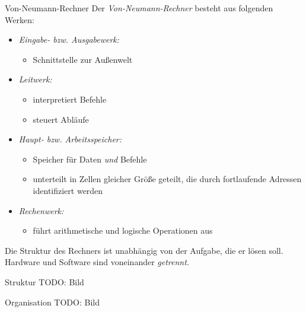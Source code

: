 \begin{defi}{Von-Neumann-Rechner}
    Der \emph{Von-Neumann-Rechner} besteht aus folgenden Werken:
    \begin{itemize}
        \item \emph{Eingabe- bzw. Ausgabewerk:}
              \begin{itemize}
                  \item Schnittstelle zur Außenwelt
              \end{itemize}
        \item \emph{Leitwerk:}
              \begin{itemize}
                  \item interpretiert Befehle
                  \item steuert Abläufe
              \end{itemize}
        \item \emph{Haupt- bzw. Arbeitsspeicher:}
              \begin{itemize}
                  \item Speicher für Daten \emph{und} Befehle
                  \item unterteilt in Zellen gleicher Größe geteilt, die durch fortlaufende Adressen identifiziert werden
              \end{itemize}
        \item \emph{Rechenwerk:}
              \begin{itemize}
                  \item führt arithmetische und logische Operationen aus
              \end{itemize}
    \end{itemize}

    Die Struktur des Rechners ist unabhängig von der Aufgabe, die er lösen soll.
    Hardware und Software sind voneinander \emph{getrennt}.
\end{defi}

\begin{defi}{Struktur}
    TODO: Bild
\end{defi}

\begin{defi}{Organisation}
    TODO: Bild
\end{defi}

